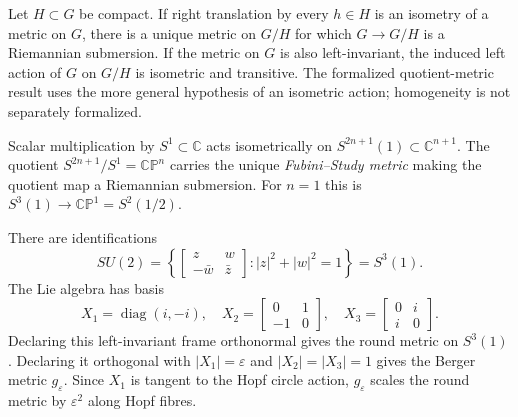 \begin{remark}
  \label{rem:pet-ch1-quotient-submersion}


  Let $H\subset G$ be compact. If right translation by every $h\in H$ is an
  isometry of a metric on $G$, there is a unique metric on $G/H$ for which
  $G\to G/H$ is a Riemannian submersion. If the metric on $G$ is also
  left-invariant, the induced left action of $G$ on $G/H$ is isometric and
  transitive. The formalized quotient-metric result uses the more general
  hypothesis of an isometric action; homogeneity is not separately formalized.
\end{remark}

\begin{example}
  \label{ex:pet-ch1-fubini-study}


  Scalar multiplication by $S^1\subset\mathbb{C}$ acts isometrically on
  $S^{2n+1}(1)\subset\mathbb{C}^{n+1}$. The quotient
  $S^{2n+1}/S^1=\mathbb{CP}^n$ carries the unique \emph{Fubini--Study metric}
  making the quotient map a Riemannian submersion. For $n=1$ this is
  $S^3(1)\to\mathbb{CP}^1=S^2(1/2)$.
\end{example}

\begin{example}
  \label{ex:pet-ch1-su2-berger}


  There are identifications
  \[
    SU(2)=\left\{\left[\begin{smallmatrix}z&w\\-\bar w&\bar z\end{smallmatrix}\right]
      :|z|^2+|w|^2=1\right\}=S^3(1).
  \]
  The Lie algebra has basis
  \[
    X_1=\operatorname{diag}(i,-i),\quad
    X_2=\left[\begin{smallmatrix}0&1\\-1&0\end{smallmatrix}\right],\quad
    X_3=\left[\begin{smallmatrix}0&i\\i&0\end{smallmatrix}\right].
  \]
  Declaring this left-invariant frame orthonormal gives the round metric on
  $S^3(1)$. Declaring it orthogonal with
  $|X_1|=\varepsilon$ and $|X_2|=|X_3|=1$ gives the Berger metric
  $g_\varepsilon$. Since $X_1$ is tangent to the Hopf circle action,
  $g_\varepsilon$ scales the round metric by $\varepsilon^2$ along Hopf fibres.
\end{example}

